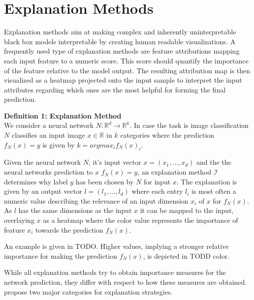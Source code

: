 \section{Explanation Methods}
\label{sec:explanation_methods}



Explanation methods aim at making complex and inherently uninterpretable black box models interpretable by creating human readable visualizations. 
A frequently used type of explanation methods are feature attributions mapping each input feature to a numeric score. This score should quantify the importance of the feature relative to the model output. The resulting attribution map is then visualized as a heatmap projected onto the input sample to interpret the input attributes regarding which ones are the most helpful for forming the final prediction. 

\textbf{Definition 1: Explanation Method}\\
We consider a neural network $N: \mathbb{R}^d \to \mathbb{R}^k$. In case the task is image classification $N$ classifies an input image $x\in  \mathbb{R}$ in $k$ categories where the prediction $f_N(x)=y$ is given by $k= arg max_i f_N(x)_i$.

Given the neural network $N$, it's input vector $x=(x_1, ..., x_d)$ and the the neural networks prediction to $x$ $f_N(x)=y$, an explanation method $\mathcal{I}$ determines why label $y$ has been chosen by $N$ for input $x$. The explanation is given by an output vector $l=(l_1, ..., l_d)$ where each entry $l_i$ is most often a numeric value describing the relevance of an input dimension $x_i$ of $x$ for $f_N(x)$. 
As $l$ has the same dimensions as the input $x$ it can be mapped to the input, overlaying $x$ as a heatmap where the color value represents the importance of feature $x_i$ towards the prediction $f_N(x)$.

An example is given in TODO. Higher values, implying a stronger relative importance for making the prediction $f_N(x)$, is depicted in TODD color. 



While all explanation methods try to obtain importance measures for the network prediction, they differ with respect to how these measures are obtained. 
\cite{evaluating_explanations_security} propose two major categories for explanation strategies.

